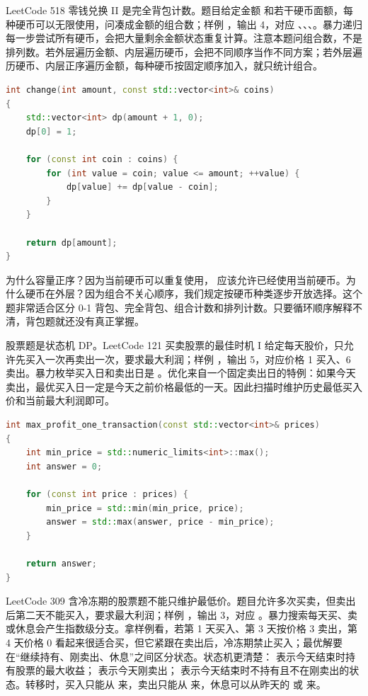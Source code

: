 LeetCode 518 零钱兑换 II 是完全背包计数。题目给定金额  和若干硬币面额，每种硬币可以无限使用，问凑成金额的组合数；样例 ，输出 4，对应 、、、。暴力递归每一步尝试所有硬币，会把大量剩余金额状态重复计算。注意本题问组合数，不是排列数。若外层遍历金额、内层遍历硬币，会把不同顺序当作不同方案；若外层遍历硬币、内层正序遍历金额，每种硬币按固定顺序加入，就只统计组合。

\begin{lstlisting}[language=C++,caption={LeetCode 518 零钱兑换 II：完全背包组合计数}]
int change(int amount, const std::vector<int>& coins)
{
    std::vector<int> dp(amount + 1, 0);
    dp[0] = 1;

    for (const int coin : coins) {
        for (int value = coin; value <= amount; ++value) {
            dp[value] += dp[value - coin];
        }
    }

    return dp[amount];
}
\end{lstlisting}

为什么容量正序？因为当前硬币可以重复使用， 应该允许已经使用当前硬币。为什么硬币在外层？因为组合不关心顺序，我们规定按硬币种类逐步开放选择。这个题非常适合区分 0-1 背包、完全背包、组合计数和排列计数。只要循环顺序解释不清，背包题就还没有真正掌握。

股票题是状态机 DP。LeetCode 121 买卖股票的最佳时机 I 给定每天股价，只允许先买入一次再卖出一次，要求最大利润；样例 ，输出 5，对应价格 1 买入、6 卖出。暴力枚举买入日和卖出日是 。优化来自一个固定卖出日的特例：如果今天卖出，最优买入日一定是今天之前价格最低的一天。因此扫描时维护历史最低买入价和当前最大利润即可。

\begin{lstlisting}[language=C++,caption={LeetCode 121 买卖股票 I：维护历史最低价格}]
int max_profit_one_transaction(const std::vector<int>& prices)
{
    int min_price = std::numeric_limits<int>::max();
    int answer = 0;

    for (const int price : prices) {
        min_price = std::min(min_price, price);
        answer = std::max(answer, price - min_price);
    }

    return answer;
}
\end{lstlisting}

LeetCode 309 含冷冻期的股票题不能只维护最低价。题目允许多次买卖，但卖出后第二天不能买入，要求最大利润；样例 ，输出 3，对应 。暴力搜索每天买、卖或休息会产生指数级分支。拿样例看，若第 1 天买入、第 3 天按价格 3 卖出，第 4 天价格 0 看起来很适合买，但它紧跟在卖出后，冷冻期禁止买入；最优解要在“继续持有、刚卖出、休息”之间区分状态。状态机更清楚： 表示今天结束时持有股票的最大收益； 表示今天刚卖出； 表示今天结束时不持有且不在刚卖出的状态。转移时，买入只能从  来，卖出只能从  来，休息可以从昨天的  或  来。

